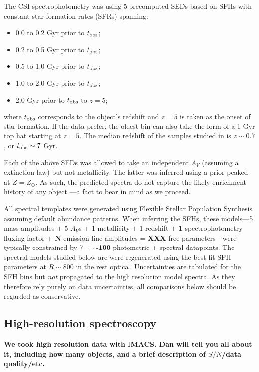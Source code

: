 \documentclass[a4paper,fleqn,usenatbib]{mnras}
\newcommand{\bfr}{\bf\color{red}}
\newcommand{\tobs}{t_{\rm obs}}
\newcommand{\bitem}{\begin{itemize}}
\newcommand{\eitem}{\end{itemize}}
\begin{document}
The CSI spectrophotometry was using 5 precomputed SEDs based on SFHs with constant star formation 
rates (SFRs) spanning:
\bitem
	\item 0.0 to 0.2 Gyr prior to $\tobs$;
	\item 0.2 to 0.5 Gyr prior to $\tobs$;
	\item 0.5 to 1.0 Gyr prior to $\tobs$;
	\item 1.0 to 2.0 Gyr prior to $\tobs$;
	\item 2.0 Gyr prior to $\tobs$ to $z=5$;
\eitem
where $\tobs$ corresponds to the object's redshift and $z=5$ is taken as the onset of star formation. If 
the data prefer, the oldest bin can also take the form of a 1 Gyr top hat starting at $z=5$.
The median redshift of the samples studied in \citet{Dressler16, Dressler18} is $z\sim0.7$, or $\tobs\sim7$ Gyr.

Each of the above SEDs was allowed to take an independent $A_{V}$ (assuming a \citealt{Calzetti00} 
extinction law) but not metallicity. The latter was inferred using a prior peaked at $Z=Z_{\odot}$. As such,
the predicted spectra do not capture the likely enrichment history of any object 
\citep[cf.][]{Pacifici12, Morishita19}---a fact to bear in mind as we proceed.

All spectral templates were generated using Flexible Stellar Population Synthesis 
\citep[FSPS;][]{ConroyGunnWhite09} assuming default abundance patterns. When inferring the SFHs, 
these models---5 mass amplitudes + 5 $A_{V}$s + 1 metallicity + 1 redshift + {\bfr 1} spectrophotometry fluxing 
factor + {\bfr N} emission line amplitudes = {\bfr XXX} free parameters---were typically constrained by 
7 + {\bfr $\sim$100} photometric + spectral datapoints. The spectral models studied below are were 
regenerated using the best-fit SFH parameters at $R\sim800$ in the rest optical. Uncertainties are tabulated
for the SFH bins but {\it not} propagated to the high resolution model spectra. As they therefore rely purely on 
data uncertainties, all comparisons below should be regarded as conservative.

\subsection{High-resolution spectroscopy}
\label{sec: hiRes}

{\bfr We took high resolution data with IMACS. Dan will tell you all about it, including how many objects, 
and a brief description of $S/N$/data quality/etc.}
\end{document}
